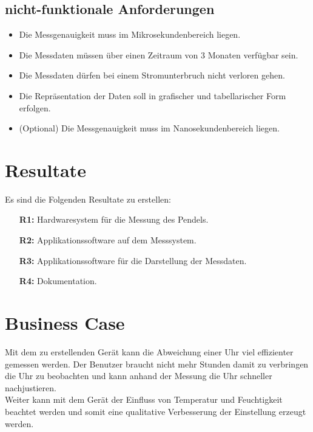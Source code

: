 \subsection{nicht-funktionale Anforderungen}
	\begin{itemize}
		\item Die Messgenauigkeit muss im Mikrosekundenbereich liegen.
        \item Die Messdaten müssen über einen Zeitraum von 3 Monaten verfügbar sein.
        \item Die Messdaten dürfen bei einem Stromunterbruch nicht verloren gehen.
		\item Die Repräsentation der Daten soll in grafischer und tabellarischer Form erfolgen.
        \item (Optional) Die Messgenauigkeit muss im Nanosekundenbereich liegen.
	\end{itemize}

\section{Resultate}
Es sind die Folgenden Resultate zu erstellen:
\begin{itemize}
	\item[\textbf{R1:}] Hardwaresystem für die Messung des Pendels.
	\item[\textbf{R2:}] Applikationssoftware auf dem Messsystem.
	\item[\textbf{R3:}] Applikationssoftware für die Darstellung der Messdaten.
	\item[\textbf{R4:}] Dokumentation.
\end{itemize}

\section{Business Case}
    Mit dem zu erstellenden Gerät kann die Abweichung einer Uhr viel effizienter gemessen werden. Der Benutzer braucht nicht mehr Stunden damit zu verbringen die Uhr zu beobachten und kann anhand der Messung die Uhr schneller nachjustieren.\\
    Weiter kann mit dem Gerät der Einfluss von Temperatur und Feuchtigkeit beachtet werden und somit eine qualitative Verbesserung der Einstellung erzeugt werden.